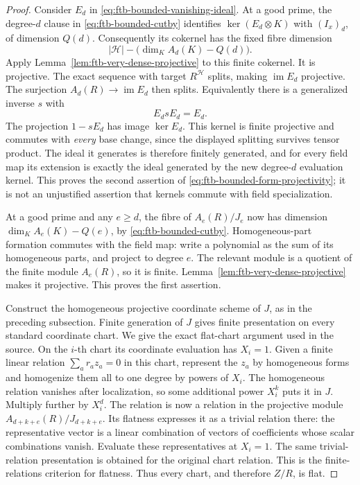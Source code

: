 \begin{proof}
Consider \(E_d\) in \eqref{eq:ftb-bounded-vanishing-ideal}.
At a good prime, the degree-\(d\) clause in
\eqref{eq:ftb-bounded-cutby} identifies
\(\ker(E_d\otimes K)\) with \((I_x)_d\), of dimension \(Q(d)\).
Consequently its cokernel has the fixed fibre dimension
\[
             |\mathcal H|-\bigl(\dim_K A_d(K)-Q(d)\bigr).
\]
Apply Lemma~\ref{lem:ftb-very-dense-projective} to this
finite cokernel.
It is projective.
The exact sequence with target \(R^{\mathcal H}\) splits,
making \(\operatorname{im}E_d\) projective.
The surjection \(A_d(R)\to\operatorname{im}E_d\) then splits.
Equivalently there is a generalized inverse \(s\) with
\[
                                  E_dsE_d=E_d.
 \tag{M10}\label{eq:ftb-evaluation-generalized-inverse}
\]
The projection \(1-sE_d\) has image \(\ker E_d\).
This kernel is finite projective and commutes with
\emph{every} base change, since the displayed splitting
survives tensor product.
The ideal it generates is therefore finitely generated,
and for every field map its extension is exactly the
ideal generated by the new degree-\(d\) evaluation kernel.
This proves the second assertion of
\eqref{eq:ftb-bounded-form-projectivity}; it is not an
unjustified assertion that kernels commute with field
specialization.

At a good prime and any \(e\ge d\), the fibre of
\(A_e(R)/J_e\) now has dimension
\(\dim_KA_e(K)-Q(e)\), by
\eqref{eq:ftb-bounded-cutby}.
Homogeneous-part formation commutes with the field map:
write a polynomial as the sum of its homogeneous parts,
and project to degree \(e\).
The relevant module is a quotient of the finite module
\(A_e(R)\), so it is finite.
Lemma~\ref{lem:ftb-very-dense-projective} makes it
projective.
This proves the first assertion.

Construct the homogeneous projective coordinate scheme
of \(J\), as in the preceding subsection.
Finite generation of \(J\) gives finite presentation
on every standard coordinate chart.
We give the exact flat-chart argument used in the source.
On the \(i\)-th chart its coordinate evaluation has
\(X_i=1\).
Given a finite linear relation
\(\sum_a r_az_a=0\) in this chart, represent the \(z_a\)
by homogeneous forms and homogenize them all to one
degree by powers of \(X_i\).
The homogeneous relation vanishes after localization,
so some additional power \(X_i^k\) puts it in \(J\).
Multiply further by \(X_i^d\).
The relation is now a relation in the projective
module \(A_{d+k+e}(R)/J_{d+k+e}\).
Its flatness expresses it as a trivial relation there:
the representative vector is a linear combination of
vectors of coefficients whose scalar combinations
vanish.
Evaluate these representatives at \(X_i=1\).
The same trivial-relation presentation is obtained for
the original chart relation.
This is the finite-relations criterion for flatness.
Thus every chart, and therefore \(Z/R\), is flat.


\end{proof}
